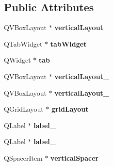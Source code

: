 \subsection*{Public Attributes}
\begin{DoxyCompactItemize}
\item 
\hypertarget{class_ui___settings_ad8d7d4091f874f7e48357232cf1b352b}{}Q\+V\+Box\+Layout $\ast$ {\bfseries vertical\+Layout}\label{class_ui___settings_ad8d7d4091f874f7e48357232cf1b352b}

\item 
\hypertarget{class_ui___settings_aa6b1acf84580a29b9d808b40c2917eca}{}Q\+Tab\+Widget $\ast$ {\bfseries tab\+Widget}\label{class_ui___settings_aa6b1acf84580a29b9d808b40c2917eca}

\item 
\hypertarget{class_ui___settings_a14a1a6430c9baae6fa72e56db8dc8b0b}{}Q\+Widget $\ast$ {\bfseries tab}\label{class_ui___settings_a14a1a6430c9baae6fa72e56db8dc8b0b}

\item 
\hypertarget{class_ui___settings_abdfe8c1606b0ade5a38897506ce087c2}{}Q\+V\+Box\+Layout $\ast$ {\bfseries vertical\+Layout\+\_}\label{class_ui___settings_abdfe8c1606b0ade5a38897506ce087c2}

\item 
\hypertarget{class_ui___settings_a5ac046c27bb432e6eb053aa8be87d2c0}{}Q\+V\+Box\+Layout $\ast$ {\bfseries vertical\+Layout\+\_}\label{class_ui___settings_a5ac046c27bb432e6eb053aa8be87d2c0}

\item 
\hypertarget{class_ui___settings_a636b45bf8fa29071e29c1638f4c62170}{}Q\+Grid\+Layout $\ast$ {\bfseries grid\+Layout}\label{class_ui___settings_a636b45bf8fa29071e29c1638f4c62170}

\item 
\hypertarget{class_ui___settings_a75c8a24bee06b34b8d2c9e09a8ffb66b}{}Q\+Label $\ast$ {\bfseries label\+\_}\label{class_ui___settings_a75c8a24bee06b34b8d2c9e09a8ffb66b}

\item 
\hypertarget{class_ui___settings_ac1971e3d73fe342826d74ebbab97e326}{}Q\+Label $\ast$ {\bfseries label\+\_}\label{class_ui___settings_ac1971e3d73fe342826d74ebbab97e326}

\item 
\hypertarget{class_ui___settings_aa5cad057486f3f49524a5da493345b21}{}Q\+Spacer\+Item $\ast$ {\bfseries vertical\+Spacer}\label{class_ui___settings_aa5cad057486f3f49524a5da493345b21}


\end{DoxyCompactItemize}
